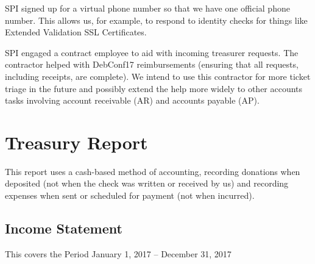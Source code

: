 \documentclass[a4paper]{report}
\begin{document}
SPI signed up for a virtual phone number so that we have one official
phone number.  This allows us, for example, to respond to identity
checks for things like Extended Validation SSL Certificates.

SPI engaged a contract employee to aid with incoming treasurer requests.
The contractor helped with DebConf17 reimbursements (ensuring that all
requests, including receipts, are complete).  We intend to use this
contractor for more ticket triage in the future and possibly extend the
help more widely to other accounts tasks involving account receivable
(AR) and accounts payable (AP).

\chapter{Treasury Report}

This report uses a cash-based method of accounting, recording donations when
deposited (not when the check was written or received by us) and recording
expenses when sent or scheduled for payment (not when incurred).

\section{Income Statement}

This covers the Period January 1, 2017 -- December 31, 2017
\end{document}
